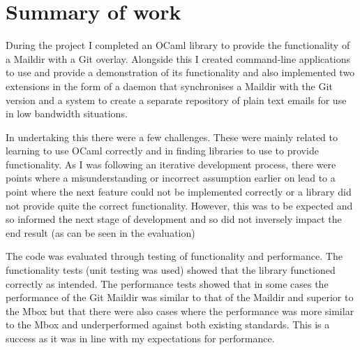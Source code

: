 \section{Summary of work}

During the project I completed an OCaml library to provide the functionality of a Maildir with a Git overlay. Alongside this I created command-line applications to use and provide a demonstration of its functionality and also implemented two extensions in the form of a daemon that synchronises a Maildir with the Git version and a system to create a separate repository of plain text emails for use in low bandwidth situations.

In undertaking this there were a few challenges. These were mainly related to learning to use OCaml correctly and in finding libraries to use to provide functionality. As I was following an iterative development process, there were points where a misunderstanding or incorrect assumption earlier on lead to a point where the next feature could not be implemented correctly or a library did not provide quite the correct functionality. However, this was to be expected and so informed the next stage of development and so did not inversely impact the end result (as can be seen in the evaluation)

The code was evaluated through testing of functionality and performance. The functionality tests (unit testing was used) showed that the library functioned correctly as intended. The performance tests showed that in some cases the performance of the Git Maildir was similar to that of the Maildir and superior to the Mbox but that there were also cases where the performance was more similar to the Mbox and underperformed against both existing standards. This is a success as it was in line with my expectations for performance.
